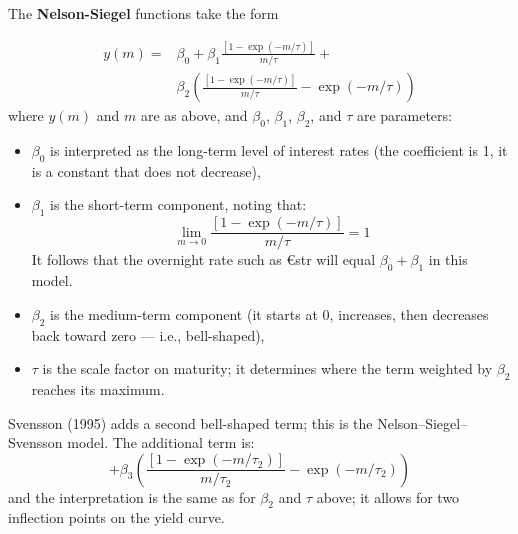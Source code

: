 \begin{f}


The \textbf{Nelson-Siegel} functions take the form

{\small\begin{align*}
y( m ) =& \beta _0 + \beta _1\frac{{\left[ {1 - \exp \left( { - m/\tau} \right)} \right]}}{m/\tau} + \\
		&\beta _2 {\left(\frac{{\left[ {1 - \exp \left( { - m/\tau} \right)} \right]}}{m/\tau} - \exp \left( { - m/\tau}\right)\right)}
\label{MTNSeq}
\end{align*}}
%
where \(y\left( m \right)\) and \(m\) are as above, and \(\beta_0\), \(\beta_1\), \(\beta_2\), and \(\tau\) are parameters:


\begin{itemize}

\item   \(\beta_0\) is interpreted as the long-term level of interest rates (the coefficient is 1, it is a constant that does not decrease),

\item   \(\beta_1\) is the short-term component, noting that:
\begin{equation*}
	\lim_{m \rightarrow 0} \frac{{\left[ {1 - \exp \left( { - m/\tau} \right)} \right]}}{m/\tau}=1
\end{equation*}
It follows that the overnight rate such as €str will equal \(\beta_0 + \beta_1\) in this model.
\item \(\beta_2\) is the medium-term component (it starts at 0, increases, then decreases back toward zero — i.e., bell-shaped),
\item \(\tau\) is the scale factor on maturity; it determines where the term weighted by \(\beta_2\) reaches its maximum.
\end{itemize}

Svensson (1995) adds a second bell-shaped term; this is the Nelson–Siegel–Svensson model. The additional term is:
%
\begin{equation*}
+\beta _3 {\left(\frac{{\left[ {1 - \exp \left( { - m/\tau_2} \right)} \right]}}{m/\tau_2} - \exp \left( { - m/\tau_2}\right)\right)}
\label{MTSveq}
\end{equation*}
and the interpretation is the same as for \(\beta_2\) and \(\tau\) above; it allows for two inflection points on the yield curve.


\end{f}
